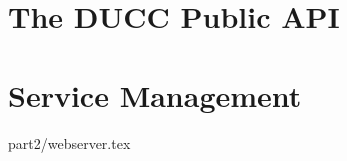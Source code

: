 \ifpdf
\else
{}
\fi

\chapter{The DUCC Public API}
\label{chap:api}


\ifpdf
\else
{}
\fi
\chapter{Service Management}
\label{chap:services}








 {part2/webserver.tex}

